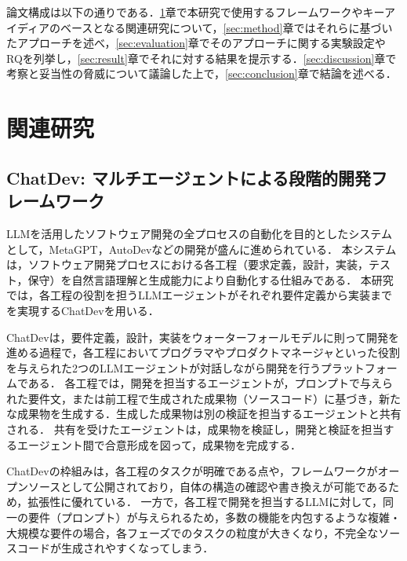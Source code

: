 \documentclass[submit,techrep,noauthor]{ipsj}
\begin{document}
論文構成は以下の通りである．\ref{sec:related}章で本研究で使用するフレームワークやキーアイディアのベースとなる関連研究について，\ref{sec:method}章ではそれらに基づいたアプローチを述べ，\ref{sec:evaluation}章でそのアプローチに関する実験設定やRQを列挙し，\ref{sec:result}章でそれに対する結果を提示する．\ref{sec:discussion}章で考察と妥当性の脅威について議論した上で，\ref{sec:conclusion}章で結論を述べる．


\section{関連研究}
\label{sec:related}

\subsection{ChatDev: マルチエージェントによる段階的開発フレームワーク}
LLMを活用したソフトウェア開発の全プロセスの自動化を目的としたシステムとして，MetaGPT，AutoDevなどの開発が盛んに進められている\cite{metagpt}\cite{autodev}．
本システムは，ソフトウェア開発プロセスにおける各工程（要求定義，設計，実装，テスト，保守）を自然言語理解と生成能力により自動化する仕組みである．
本研究では，各工程の役割を担うLLMエージェントがそれぞれ要件定義から実装までを実現するChatDev\cite{qian-etal-2024-chatdev}を用いる．

ChatDevは，要件定義，設計，実装をウォーターフォールモデルに則って開発を進める過程で，各工程においてプログラマやプロダクトマネージャといった役割を与えられた2つのLLMエージェントが対話しながら開発を行うプラットフォームである．
各工程では，開発を担当するエージェントが，プロンプトで与えられた要件文，または前工程で生成された成果物（ソースコード）に基づき，新たな成果物を生成する．生成した成果物は別の検証を担当するエージェントと共有される．
共有を受けたエージェントは，成果物を検証し，開発と検証を担当するエージェント間で合意形成を図って，成果物を完成する．

ChatDevの枠組みは，各工程のタスクが明確である点や，フレームワークがオープンソースとして公開されており，自体の構造の確認や書き換えが可能であるため，拡張性に優れている．
一方で，各工程で開発を担当するLLMに対して，同一の要件（プロンプト）が与えられるため，多数の機能を内包するような複雑・大規模な要件の場合，各フェーズでのタスクの粒度が大きくなり，不完全なソースコードが生成されやすくなってしまう．


\end{document}

